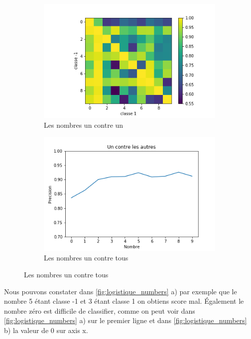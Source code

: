 \documentclass[a4paper,12pt]{article}
\begin{document}
\begin{figure}[h!]
\caption{La regression logistique}
\label{fig:logistique_numbers}
\begin{subfigure}{.5\textwidth}
	\centering
	\includegraphics[width=\linewidth]{images/tme3/logistic_one_vs_one.png}
	\caption{Les nombres un contre un}
\end{subfigure}%
\begin{subfigure}{.5\textwidth}
  \centering
	\includegraphics[width=\linewidth]{images/tme3/USPS_one_vs_all.png}
	\caption{Les nombres un contre tous}
\end{subfigure}
\end{figure}

Nous pouvons constater dans \autoref{fig:logistique_numbers} a) par exemple que le nombre 5 étant classe -1 et 3 étant classe 1 on obtiens score mal. 
Également le nombre zéro est difficile de classifier, comme on peut voir dans \autoref{fig:logistique_numbers} a) sur 
le premier ligne et dans \autoref{fig:logistique_numbers} b) la valeur de 0 sur axis x.
\end{document}
